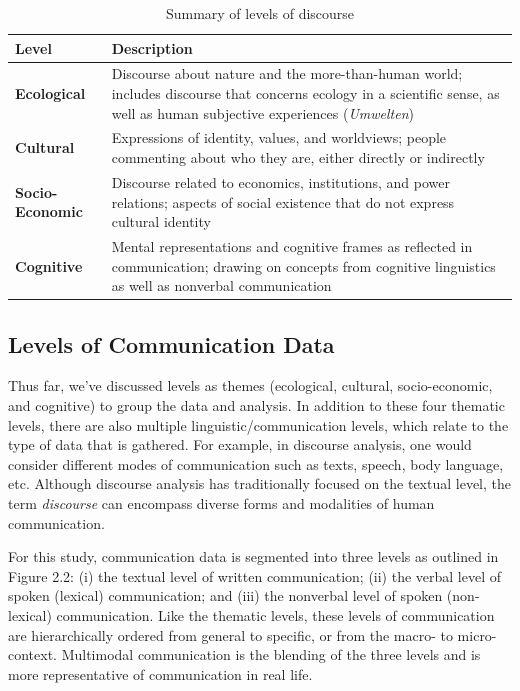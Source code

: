 \begin{table}[H]
\begin{footnotesize}
\centering
\def\arraystretch{1.5}%
\begin{tabular}{ | P{4cm}| P{5.75cm} | }  
 \hline
\textbf{Level} & \textbf{Description} \\
 \hline
\textbf{Ecological} & Discourse about nature and the more-than-human world; includes discourse that concerns ecology in a scientific sense, as well as human subjective experiences (\textit{Umwelten}) \\
 \hline
\textbf{Cultural} & Expressions of identity, values, and worldviews; people commenting about who they are, either directly or indirectly  \\
 \hline
\textbf{Socio-Economic} &  Discourse related to economics, institutions, and power relations; aspects of social existence that do not express cultural identity \\
 \hline
\textbf{Cognitive} & Mental representations and cognitive frames as reflected in communication; drawing on concepts from cognitive linguistics as well as nonverbal communication \\
 \hline
\end{tabular}
\caption{Summary of levels of discourse}
\label{tab:table1}
\end{footnotesize}
\end{table}

\subsection{Levels of Communication Data}

Thus far, we've discussed levels as themes (ecological, cultural, socio-economic, and cognitive) to group the data and analysis. In addition to these four thematic levels, there are also multiple linguistic/communication levels, which relate to the type of data that is gathered. For example, in discourse analysis, one would consider different modes of communication such as texts, speech, body language, etc. Although discourse analysis has traditionally focused on the textual level, the term \textit{discourse} can encompass diverse forms and modalities of human communication.

For this study, communication data is segmented into three levels as outlined in Figure 2.2: (i) the textual level of written communication; (ii) the verbal level of spoken (lexical) communication; and (iii) the nonverbal level of spoken (non-lexical) communication. Like the thematic levels, these levels of communication are hierarchically ordered from general to specific, or from the macro- to micro-context. Multimodal communication is the blending of the three levels and is more representative of communication in real life.

